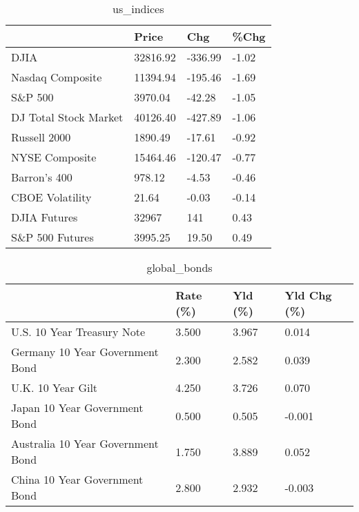 \documentclass{article}%
\begin{document}
%


\begin{table}[htbp]%
\caption{us\_indices}%
\centering%
\begin{adjustbox}{width=1\textwidth}%
\begin{tabular}{llll}
\toprule
                      &    Price &     Chg &  \%Chg \\
\midrule
                 DJIA & 32816.92 & -336.99 & -1.02 \\
     Nasdaq Composite & 11394.94 & -195.46 & -1.69 \\
              S\&P 500 &  3970.04 &  -42.28 & -1.05 \\
DJ Total Stock Market & 40126.40 & -427.89 & -1.06 \\
         Russell 2000 &  1890.49 &  -17.61 & -0.92 \\
       NYSE Composite & 15464.46 & -120.47 & -0.77 \\
         Barron's 400 &   978.12 &   -4.53 & -0.46 \\
      CBOE Volatility &    21.64 &   -0.03 & -0.14 \\
         DJIA Futures &    32967 &     141 &  0.43 \\
      S\&P 500 Futures &  3995.25 &   19.50 &  0.49 \\
\bottomrule
\end{tabular}
%
\end{adjustbox}%
\end{table}

%


\begin{table}[htbp]%
\caption{global\_bonds}%
\centering%
\begin{adjustbox}{width=1\textwidth}%
\begin{tabular}{llll}
\toprule
                                  & Rate (\%) & Yld (\%) & Yld Chg (\%) \\
\midrule
       U.S. 10 Year Treasury Note &    3.500 &   3.967 &       0.014 \\
  Germany 10 Year Government Bond &    2.300 &   2.582 &       0.039 \\
                U.K. 10 Year Gilt &    4.250 &   3.726 &       0.070 \\
    Japan 10 Year Government Bond &    0.500 &   0.505 &      -0.001 \\
Australia 10 Year Government Bond &    1.750 &   3.889 &       0.052 \\
    China 10 Year Government Bond &    2.800 &   2.932 &      -0.003 \\
\bottomrule
\end{tabular}
%
\end{adjustbox}%
\end{table}
\end{document}
